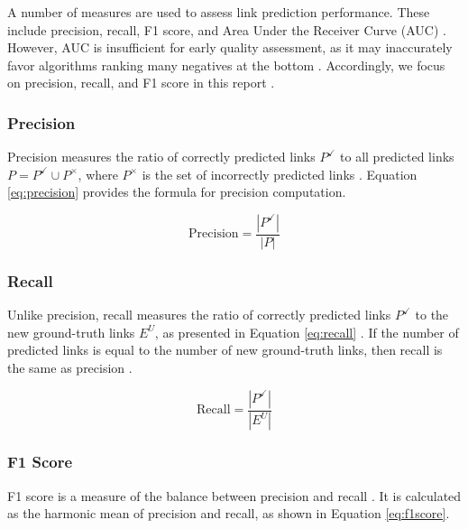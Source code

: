A number of measures are used to assess link prediction performance. These include precision, recall, F1 score, and Area Under the Receiver Curve (AUC) \cite{arrar2023comprehensive}. However, AUC is insufficient for early quality assessment, as it may inaccurately favor algorithms ranking many negatives at the bottom \cite{zhou2021progresses, yang2015evaluating, lichtnwalter2012link}. Accordingly, we focus on precision, recall, and F1 score in this report \cite{lu2015toward}.


\subsubsection{Precision}

Precision measures the ratio of correctly predicted links $P^\checkmark$ to all predicted links $P = P^\checkmark \cup P^\times$, where $P^\times$ is the set of incorrectly predicted links \cite{arrar2023comprehensive, zhou2021progresses}. Equation \ref{eq:precision} provides the formula for precision computation.

\begin{equation}
\label{eq:precision}
  \text{Precision} = \frac{|P^\checkmark|}{|P|}
\end{equation}


\subsubsection{Recall}

Unlike precision, recall measures the ratio of correctly predicted links $P^\checkmark$ to the new ground-truth links $E^U$, as presented in Equation \ref{eq:recall} \cite{arrar2023comprehensive, zhou2021progresses}. If the number of predicted links is equal to the number of new ground-truth links, then recall is the same as precision \cite{zhou2021progresses, lu2011link, liben2003link}.

\begin{equation}
\label{eq:recall}
  \text{Recall} = \frac{|P^\checkmark|}{|E^U|}
\end{equation}


\subsubsection{F1 Score}

F1 score is a measure of the balance between precision and recall \cite{arrar2023comprehensive}. It is calculated as the harmonic mean of precision and recall, as shown in Equation \ref{eq:f1score}.

